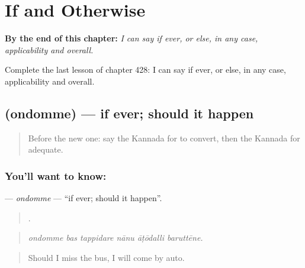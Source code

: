 
\chapter{If and Otherwise}
\label{ch:ka-if-and-otherwise}

\begin{chapteropening}
\textbf{By the end of this chapter:} \emph{I can say if ever, or else, in any case, applicability and overall.}

Complete the last lesson of chapter 428: I can say if ever, or else, in any case, applicability and overall.
\end{chapteropening}

\section[\texorpdfstring{\kn{ಒಂದೊಮ್ಮೆ} (ondomme)}{ಒಂದೊಮ್ಮೆ (ondomme)}]{ (ondomme) — if ever; should it happen}

\label{lesson:KA-C428-ondomme}



\begin{quote}
Before the new one: say the Kannada for to convert, then the Kannada for adequate.
\end{quote}

\subsection*{You'll want to know: }
\textbf{} — \emph{ondomme} — \textquotedblleft{}if ever; should it happen\textquotedblright{}.

\begin{quote}
     .
\end{quote}

\begin{quote}
\emph{ondomme bas tappidare nānu āṭōdalli baruttēne.}
\end{quote}

\begin{quote}
Should I miss the bus, I will come by auto.
\end{quote}

